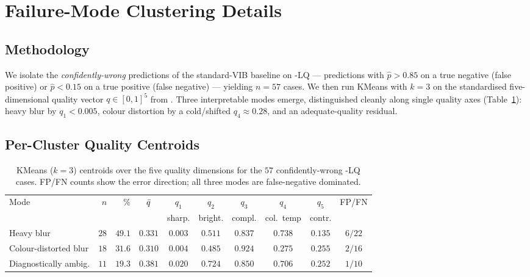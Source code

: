 
\section{Failure-Mode Clustering Details}\label{app:a18}

\subsection{Methodology}\label{app:a18-method}
We isolate the \emph{confidently-wrong} predictions of the standard-VIB baseline on \itb-LQ ---
predictions with $\hat{p}>0.85$ on a true negative (false positive) or $\hat{p}<0.15$ on a true
positive (false negative) --- yielding $n=57$ cases. We then run KMeans with $k=3$ on the
standardised five-dimensional quality vector $q\in[0,1]^5$ from \visiscore. Three interpretable modes
emerge, distinguished cleanly along single quality axes (Table~\ref{tab:failure-centroids}): heavy
blur by $q_1<0.005$, colour distortion by a cold/shifted $q_4\approx 0.28$, and an
adequate-quality residual.

\subsection{Per-Cluster Quality Centroids}\label{app:a18-centroids}
\begin{table}[t]
\centering
\caption{KMeans ($k=3$) centroids over the five quality dimensions for the $57$ confidently-wrong
\itb-LQ cases. FP/FN counts show the error direction; all three modes are false-negative dominated.}
\label{tab:failure-centroids}
\begin{tabular}{lrrccccccc}
\toprule
Mode & $n$ & \% & $\bar{q}$ & $q_1$ & $q_2$ & $q_3$ & $q_4$ & $q_5$ & FP/FN \\
 & & & & sharp. & bright. & compl. & col.\ temp & contr. & \\
\midrule
Heavy blur            & $28$ & $49.1$ & $0.331$ & $0.003$ & $0.511$ & $0.837$ & $0.738$ & $0.135$ & $6/22$ \\
Colour-distorted blur & $18$ & $31.6$ & $0.310$ & $0.004$ & $0.485$ & $0.924$ & $0.275$ & $0.255$ & $2/16$ \\
Diagnostically ambig. & $11$ & $19.3$ & $0.381$ & $0.020$ & $0.724$ & $0.850$ & $0.706$ & $0.252$ & $1/10$ \\
\bottomrule
\end{tabular}
\end{table}

